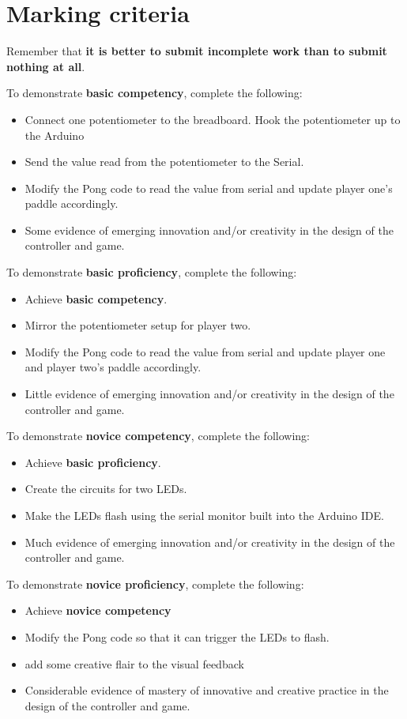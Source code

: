 \documentclass{../../../../fal_assignment}
\begin{document}
\section*{Marking criteria}

Remember that \textbf{it is better to submit incomplete work than to submit nothing at all}. 

To demonstrate \textbf{basic competency}, complete the following:
\begin{itemize}
	\item Connect one potentiometer to the breadboard. Hook the potentiometer up to the Arduino
	\item Send the value read from the potentiometer to the Serial.
	\item Modify the Pong code to read the value from serial and update player one's paddle accordingly.
	\item Some evidence of emerging innovation and/or creativity in the design of the controller and game.
\end{itemize} 

To demonstrate \textbf{basic proficiency}, complete the following:
\begin{itemize}
	\item Achieve \textbf{basic competency}.
	\item Mirror the potentiometer setup for player two.
	\item Modify the Pong code to read the value from serial and update player one and player two's paddle accordingly.
	\item Little evidence of emerging innovation and/or creativity in the design of the controller and game.
\end{itemize}

To demonstrate \textbf{novice competency}, complete the following:
\begin{itemize}
	\item Achieve \textbf{basic proficiency}.
	\item Create the circuits for two LEDs.
	\item Make the LEDs flash using the serial monitor built into the Arduino IDE.
	\item Much evidence of emerging innovation and/or creativity in the design of the controller and game.
\end{itemize}

To demonstrate \textbf{novice proficiency}, complete the following:
\begin{itemize}
	\item Achieve \textbf{novice competency}
	\item Modify the Pong code so that it can trigger the LEDs to flash.
	\item add some creative flair to the visual feedback
	\item Considerable evidence of mastery of innovative and creative practice in the design of the controller and game.
\end{itemize}
\end{document}
